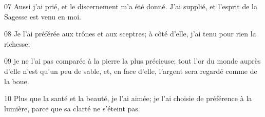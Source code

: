 
07 Aussi j’ai prié, et le discernement m’a été donné. J’ai supplié, et l’esprit de la Sagesse est venu en moi.

08 Je l’ai préférée aux trônes et aux sceptres; à côté d’elle, j’ai tenu pour rien la richesse;

09 je ne l’ai pas comparée à la pierre la plus précieuse; tout l’or du monde auprès d’elle n’est qu’un peu de sable, et, en face d’elle, l’argent sera regardé comme de la boue.

10 Plus que la santé et la beauté, je l’ai aimée; je l’ai choisie de préférence à la lumière, parce que sa clarté ne s’éteint pas.
